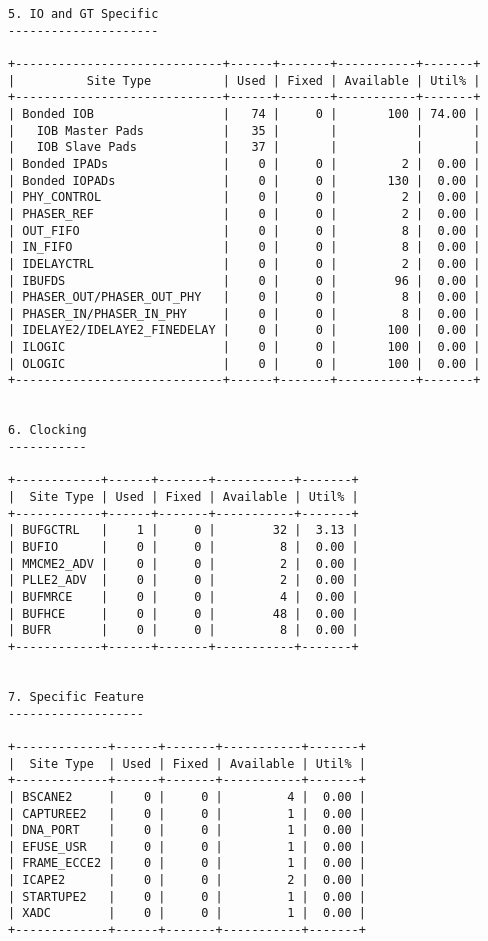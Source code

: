 \begin{Verbatim}[fontsize=\footnotesize,xleftmargin=-1cm]
5. IO and GT Specific
---------------------

+-----------------------------+------+-------+-----------+-------+
|          Site Type          | Used | Fixed | Available | Util% |
+-----------------------------+------+-------+-----------+-------+
| Bonded IOB                  |   74 |     0 |       100 | 74.00 |
|   IOB Master Pads           |   35 |       |           |       |
|   IOB Slave Pads            |   37 |       |           |       |
| Bonded IPADs                |    0 |     0 |         2 |  0.00 |
| Bonded IOPADs               |    0 |     0 |       130 |  0.00 |
| PHY_CONTROL                 |    0 |     0 |         2 |  0.00 |
| PHASER_REF                  |    0 |     0 |         2 |  0.00 |
| OUT_FIFO                    |    0 |     0 |         8 |  0.00 |
| IN_FIFO                     |    0 |     0 |         8 |  0.00 |
| IDELAYCTRL                  |    0 |     0 |         2 |  0.00 |
| IBUFDS                      |    0 |     0 |        96 |  0.00 |
| PHASER_OUT/PHASER_OUT_PHY   |    0 |     0 |         8 |  0.00 |
| PHASER_IN/PHASER_IN_PHY     |    0 |     0 |         8 |  0.00 |
| IDELAYE2/IDELAYE2_FINEDELAY |    0 |     0 |       100 |  0.00 |
| ILOGIC                      |    0 |     0 |       100 |  0.00 |
| OLOGIC                      |    0 |     0 |       100 |  0.00 |
+-----------------------------+------+-------+-----------+-------+


6. Clocking
-----------

+------------+------+-------+-----------+-------+
|  Site Type | Used | Fixed | Available | Util% |
+------------+------+-------+-----------+-------+
| BUFGCTRL   |    1 |     0 |        32 |  3.13 |
| BUFIO      |    0 |     0 |         8 |  0.00 |
| MMCME2_ADV |    0 |     0 |         2 |  0.00 |
| PLLE2_ADV  |    0 |     0 |         2 |  0.00 |
| BUFMRCE    |    0 |     0 |         4 |  0.00 |
| BUFHCE     |    0 |     0 |        48 |  0.00 |
| BUFR       |    0 |     0 |         8 |  0.00 |
+------------+------+-------+-----------+-------+


7. Specific Feature
-------------------

+-------------+------+-------+-----------+-------+
|  Site Type  | Used | Fixed | Available | Util% |
+-------------+------+-------+-----------+-------+
| BSCANE2     |    0 |     0 |         4 |  0.00 |
| CAPTUREE2   |    0 |     0 |         1 |  0.00 |
| DNA_PORT    |    0 |     0 |         1 |  0.00 |
| EFUSE_USR   |    0 |     0 |         1 |  0.00 |
| FRAME_ECCE2 |    0 |     0 |         1 |  0.00 |
| ICAPE2      |    0 |     0 |         2 |  0.00 |
| STARTUPE2   |    0 |     0 |         1 |  0.00 |
| XADC        |    0 |     0 |         1 |  0.00 |
+-------------+------+-------+-----------+-------+



\end{Verbatim}
